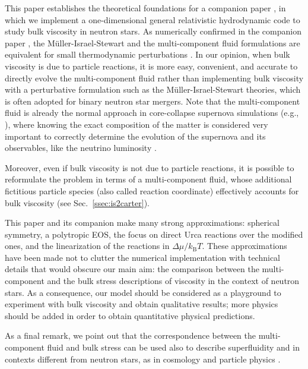 \documentclass[aps,prd,twocolumn,a4paper,floatfix,nofootbib,superscriptaddress,nofootinbib]{revtex4}
\begin{document}
This paper establishes the theoretical foundations for a companion paper
\cite{Camelio22b}, in which we implement a one-dimensional general relativistic
hydrodynamic code \cite{Camelio22code} to study bulk viscosity in neutron stars.
%
As numerically confirmed in the companion paper \citep{Camelio22b}, the
M\"uller-Israel-Stewart and the multi-component fluid formulations are
equivalent for small thermodynamic perturbations \citep{Gavassino21bulk}.  In
our opinion, when bulk viscosity is due to particle reactions, it is more easy,
convenient, and accurate to directly evolve the multi-component fluid rather
than implementing bulk viscosity with a perturbative formulation such as the
M\"uller-Israel-Stewart theories, which is often adopted for binary neutron
star mergers.
%
Note that the multi-component fluid is already the normal approach in
core-collapse supernova simulations (e.g., \citet{OConnor10}), where knowing the
exact composition of the matter is considered very important to correctly
determine the evolution of the supernova and its observables, like the neutrino
luminosity \cite{Burrows88}.

Moreover, even if bulk viscosity is not due to particle reactions, it is
possible to reformulate the problem in terms of a multi-component fluid, whose
additional fictitious particle species (also called reaction coordinate)
effectively accounts for bulk viscosity (see Sec.~\ref{ssec:is2carter}).

This paper and its companion \cite{Camelio22b} make many strong approximations:
spherical symmetry, a polytropic EOS, the focus on direct Urca reactions over
the modified ones, and the linearization of the reactions in $\Delta
\mu/k_\mathrm{B}T$.
%
These approximations have been made not to clutter the numerical implementation
with technical details that would obscure our main aim: the comparison between
the multi-component and the bulk stress descriptions of viscosity in the
context of neutron stars.
%
As a consequence, our model should be considered as a playground to experiment
with bulk viscosity and obtain qualitative results; more physics should be
added in order to obtain quantitative physical predictions.

As a final remark, we point out that the correspondence between the
multi-component fluid and bulk stress can be used also to describe
superfluidity \cite{superbulk_PRD_2022} and in contexts different from neutron
stars, as in cosmology \cite{Hiscock91, Zakari93, Maartens95} and particle
physics \cite{DelZanna13}.
\end{document}
